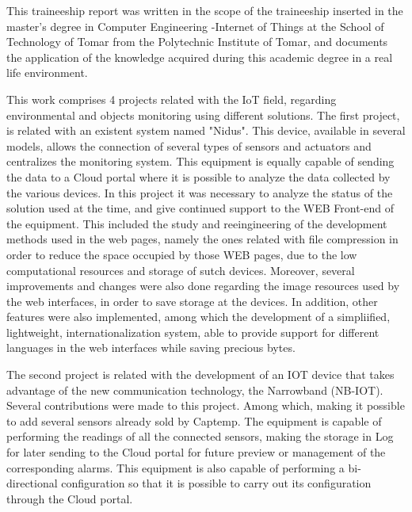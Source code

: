 
\vspace{1cm}
\noindent
\textbf{} 

\par This traineeship report was written in the scope of the traineeship inserted in the master's degree in Computer Engineering -Internet of Things at the School of Technology of Tomar from the Polytechnic Institute of Tomar, and documents the application of the knowledge acquired during this academic degree in a real life environment.


\par This work comprises 4 projects related with the IoT field, regarding environmental and objects monitoring using different solutions. The first project, is related with an existent system named "Nidus". This device, available in several models, allows the connection of several types of sensors and actuators and centralizes the monitoring system. This equipment is equally capable of sending the data to a Cloud portal where it is possible to analyze the data collected by the various devices. In this project it was necessary to analyze the status of the solution used at the time, and give continued support to the WEB Front-end of the equipment. This included the study and reeingineering of the development methods used in the web pages, namely the ones related with file compression in order to reduce the space occupied by those WEB pages, due to the low computational resources and storage of sutch devices. Moreover, several improvements and changes were also done regarding the image resources used by the web interfaces, in order to save storage at the devices. In addition, other features were also implemented, among which the development of a simpliified, lightweight, internationalization system, able to provide support for different languages in the web interfaces while saving precious bytes. 


\par The second project is related with the development of an IOT device that takes advantage of the new communication technology, the Narrowband (NB-IOT). Several contributions were made to this project. Among which, making it possible to add several sensors already sold by Captemp. The equipment is capable of performing the readings of all the connected sensors, making the storage in Log for later sending to the Cloud portal for future preview or management of the corresponding alarms. This equipment is also capable of performing a bi-directional configuration so that it is possible to carry out its configuration through the Cloud portal.


